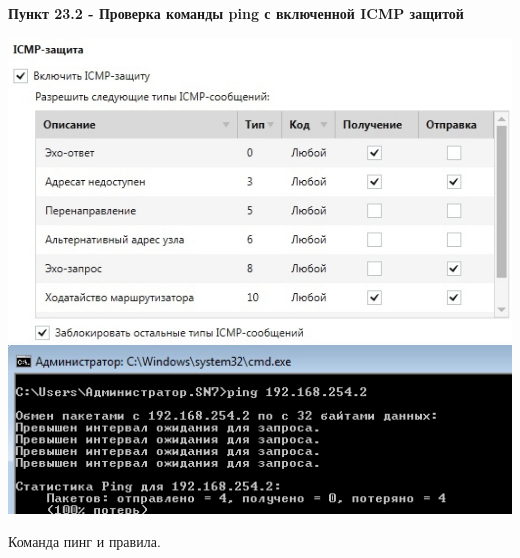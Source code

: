 \documentclass[a4paper,14pt]{extarticle}
\begin{document}
    \textbf{Пункт 23.2 - Проверка команды ping с включенной ICMP защитой}
    \begin{center}
        \includegraphics[scale=0.45]{pics/23.2_1.jpg}
        \includegraphics[scale=0.45]{pics/23.2_2.jpg}

        Команда пинг и правила.
    \end{center}
\end{document}

